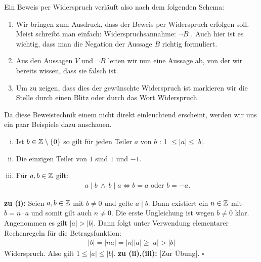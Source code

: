 Ein Beweis per Widerspruch verläuft also nach dem folgenden Schema:
\begin{enumerate}
    \item
    Wir bringen zum Ausdruck, dass der Beweis per Widerspruch erfolgen soll. Meist schreibt man einfach: \glqq Widerspruchsannahme: $\neg B$ \grqq.
    Auch hier ist es wichtig, dass man die Negation der Aussage $B$ richtig formuliert.
    \item
    Aus den Aussagen $V$ und $\neg B$ leiten wir nun eine Aussage ab, von der wir bereits wissen, dass sie falsch ist.
    \item
    Um zu zeigen, dass dies der gewünschte Widerspruch ist markieren wir die Stelle durch einen Blitz oder durch das Wort \glqq Widerspruch\grqq.
\end{enumerate}

Da diese Beweistechnik einem nicht direkt einleuchtend erscheint, werden wir
uns ein paar Beispiele dazu anschauen.

\begin{lemma}
    \begin{enumerate}[(i)]
        \item
        Ist $b \in \mathbb{Z} \setminus \{0\}$ so gilt für jeden Teiler $a$ von $b$ : 1 $\leq \lvert a \rvert \leq \lvert b \rvert$.
        \item
        Die einzigen Teiler von $1$ sind $1$ und $-1$.
        \item
        Für $a,b \in \mathbb{Z}$ gilt:
        \begin{align*}
            a \mid b \ \wedge \ b \mid a \iff b = a \text{  oder } b = -a.
        \end{align*}
    \end{enumerate}
\end{lemma}

\begin{proof*}
\textbf{zu (i):}\newline
Seien $a,b \in \mathbb{Z}$ mit $b \neq 0$ und gelte $a \mid b$.
Dann existiert ein $n \in \mathbb{Z}$ mit $b = n \cdot a$ und somit gilt auch $n \neq 0$.
Die erste Ungleichung ist wegen $b \neq 0$ klar.
Angenommen es gilt $\lvert a \rvert > \lvert b \rvert$.
Dann folgt unter Verwendung elementarer Rechenregeln für die Betragsfunktion:
\begin{align*}
        \lvert b \rvert = \lvert n a \rvert = \lvert n \rvert \lvert a \rvert \geq \lvert a \rvert > \lvert b \rvert
\end{align*}
Widerspruch.
Also gilt $1 \leq \lvert a \rvert \leq \lvert b \rvert$.\newline
 \textbf{zu (ii),(iii):} [Zur Übung].
 \hfill $\square$
\end{proof*}

